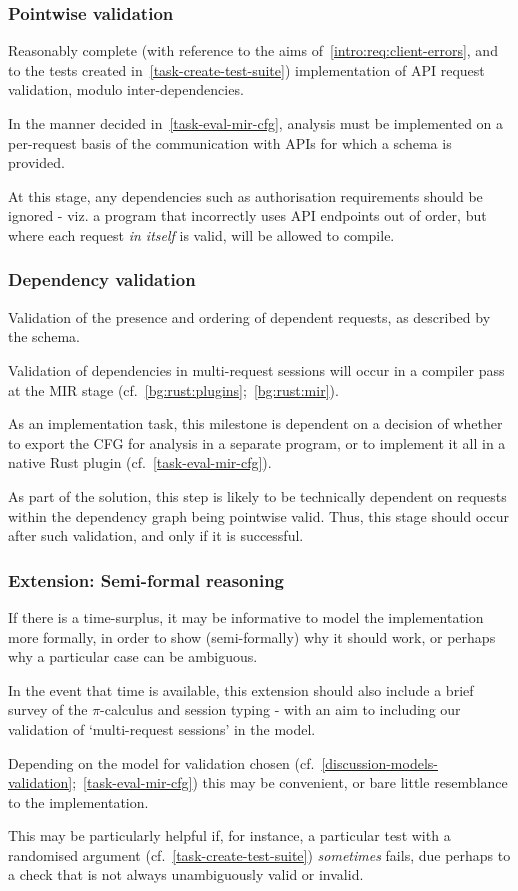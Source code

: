 \subsubsection{Pointwise validation}
Reasonably complete (with reference to the aims of~\ref{intro:req:client-errors}, and to the tests created in~\ref{task-create-test-suite}) implementation of API request validation, modulo inter-dependencies.


In the manner decided in~\ref{task-eval-mir-cfg}, analysis must be implemented on a per-request basis of the communication with APIs for which a schema is provided.

At this stage, any dependencies such as authorisation requirements should be ignored - viz. a program that incorrectly uses API endpoints out of order, but where each request \emph{in itself} is valid, will be allowed to compile.

\subsubsection{Dependency validation}
Validation of the presence and ordering of dependent requests, as described by the schema.


Validation of dependencies in multi-request sessions will occur in a compiler pass at the MIR stage (cf.~\ref{bg:rust:plugins};~\ref{bg:rust:mir}).

As an implementation task, this milestone is dependent on a decision of whether to export the CFG for analysis in a separate program, or to implement it all in a native Rust plugin (cf.~\ref{task-eval-mir-cfg}).

As part of the solution, this step is likely to be technically dependent on requests within the dependency graph being pointwise valid. Thus, this stage should occur after such validation, and only if it is successful.

\subsubsection{Extension: Semi-formal reasoning}
If there is a time-surplus, it may be informative to model the implementation more formally, in order to show (semi-formally) why it should work, or perhaps why a particular case can be ambiguous.

In the event that time is available, this extension should also include a brief survey of the $\pi$-calculus and session typing - with an aim to including our validation of `multi-request sessions' in the model.

Depending on the model for validation chosen (cf.~\ref{discussion-models-validation};~\ref{task-eval-mir-cfg}) this may be convenient, or bare little resemblance to the implementation.

This may be particularly helpful if, for instance, a particular test with a randomised argument (cf.~\ref{task-create-test-suite}) \emph{sometimes} fails, due perhaps to a check that is not always unambiguously valid or invalid.
